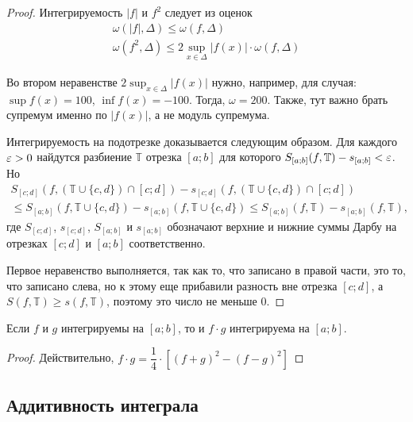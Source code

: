 \documentclass[a4paper]{article}
\theoremstyle{named}
\newcommand{\T}{\mathbb{T}}
\begin{document}
        \begin{proof}
            Интегрируемость $|f|$ и $f^2$ следует из оценок
            \[\begin{gathered}
                \omega(|f|, \Delta) \leq \omega(f, \Delta) \\
                \omega(f^2, \Delta) \leq 2 \sup_{x \in \Delta} |f(x)| \cdot \omega(f, \Delta)
            \end{gathered}\]

            Во втором неравенстве $2 \sup_{x \in \Delta} |f(x)|$ нужно, например, для случая: $\sup f(x) = 100$, $\inf f(x) = -100$. Тогда, $\omega = 200$. Также, тут важно брать супремум именно по $|f(x)|$, а не модуль супремума.

            Интегрируемость на подотрезке доказывается следующим образом. Для каждого $\varepsilon > 0$ найдутся разбиение $\T$ отрезка $[a; b]$ для которого $S_{[a; b]}(f, \T) - s_{[a; b]} < \eps$. Но
            \[\begin{gathered}
                S_{[c; d]}(f, (\T \cup \{c, d\}) \cap [c; d]) - s_{[c; d]}(f, (\T \cup \{c, d\}) \cap [c; d]) \\
                \leq S_{[a; b]}(f, \T \cup \{c, d\}) - s_{[a; b]}(f, \T \cup \{c, d\}) \leq S_{[a; b]}(f, \T) - s_{[a; b]}(f, \T),
            \end{gathered}\]
            где $S_{[c; d]}$, $s_{[c; d]}$, $S_{[a; b]}$ и $s_{[a; b]}$ обозначают верхние и нижние суммы Дарбу на отрезках $[c; d]$ и $[a; b]$ соответственно.

            Первое неравенство выполняется, так как то, что записано в правой части, это то, что записано слева, но к этому еще прибавили разность вне отрезка $[c; d]$, а $S(f, \T) \geq s(f, \T)$, поэтому это число не меньше $0$.
        \end{proof}

        \begin{consequence*}
            Если $f$ и $g$ интегрируемы на $[a; b]$, то и $f \cdot g$ интегрируема на $[a; b]$.
        \end{consequence*}

        \begin{proof}
            Действительно, $f \cdot g = \dfrac{1}{4} \cdot \left[(f + g)^2 - (f - g)^2\right]$
        \end{proof}

        \subsection{Аддитивность интеграла}
\end{document}
